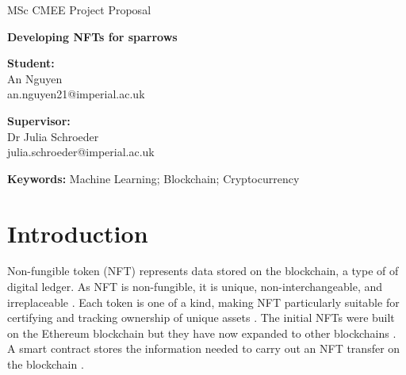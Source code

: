 \documentclass[11pt]{article}
\begin{document}
	\begin{titlepage}
		
		\centering
			
		\vspace*{3cm}
		\LARGE
		MSc CMEE Project Proposal
		
		\vspace*{7cm}
		\Huge
		\textbf{Developing NFTs for sparrows}\\
		
		\vspace{2cm}
		\LARGE
		
		\vfill
		
		\begin{flushleft}
			
		\large
		
		\textbf{Student:}\\
		An Nguyen\\
		an.nguyen21@imperial.ac.uk\\
		
		\vspace{1cm}
		
		\textbf{Supervisor:}\\
		Dr Julia Schroeder\\
		julia.schroeder@imperial.ac.uk\\
	
		\vspace{2cm}
		\end{flushleft}

	\end{titlepage}
	
	\linenumbers
	\onehalfspacing
\textbf{Keywords:} Machine Learning; Blockchain; Cryptocurrency

\section*{Introduction}
		
		Non-fungible token (NFT) represents data stored on the blockchain, a type of of digital ledger. As NFT is non-fungible, it is unique, non-interchangeable, and irreplaceable \citep{city27164} \citep{math10030335}. Each token is one of a kind, making NFT particularly suitable for certifying and tracking ownership of unique assets \citep{city27164}. The initial NFTs were built on the Ethereum blockchain but they have now expanded to other blockchains \citep{city27164} \citep{10.1007/978-981-16-3961-6_34}. A smart contract stores the information needed to carry out an NFT transfer on the blockchain \citep{10.1007/978-981-16-3961-6_34}. 
		
\end{document}
